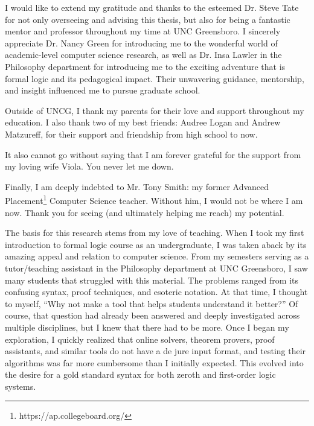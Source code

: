 \documentclass[ms]{uncgdissertationexp2}
\theoremstyle{plain}
\theoremstyle{definition}
\theoremstyle{remark}
\begin{document}
\begin{acknowledgments}
	I would like to extend my gratitude and thanks to the esteemed Dr. Steve Tate for not only overseeing and advising this thesis, but also for being a fantastic mentor and professor throughout my time at UNC Greensboro. I sincerely appreciate Dr. Nancy Green for introducing me to the wonderful world of academic-level computer science research, as well as Dr. Insa Lawler in the Philosophy department for introducing me to the exciting adventure that is formal logic and its pedagogical impact. Their unwavering guidance, mentorship, and insight influenced me to pursue graduate school.
	
	Outside of UNCG, I thank my parents for their love and support throughout my education. I also thank two of my best friends: Audree Logan and Andrew Matzureff, for their support and friendship from high school to now.
	
	It also cannot go without saying that I am forever grateful for the support from my loving wife Viola. You never let me down.
	
	Finally, I am deeply indebted to Mr. Tony Smith: my former Advanced Placement\footnote{https://ap.collegeboard.org/} Computer Science teacher. Without him, I would not be where I am now. Thank you for seeing (and ultimately helping me reach) my potential.
\end{acknowledgments}

\begin{preface}
	The basis for this research stems from my love of teaching. When I took my first introduction to formal logic course as an undergraduate, I was taken aback by its amazing appeal and relation to computer science. From my semesters serving as a tutor/teaching assistant in the Philosophy department at UNC Greensboro, I saw many students that struggled with this material. The problems ranged from its confusing syntax, proof techniques, and esoteric notation. At that time, I thought to myself, ``Why not make a tool that helps students understand it better?'' Of course, that question had already been answered and deeply investigated across multiple disciplines, but I knew that there had to be more. Once I began my exploration, I quickly realized that online solvers, theorem provers, proof assistants, and similar tools do not have a de jure input format, and testing their algorithms was far more cumbersome than I initially expected. This evolved into the desire for a gold standard syntax for both zeroth and first-order logic systems.
\end{preface}
\end{document}
